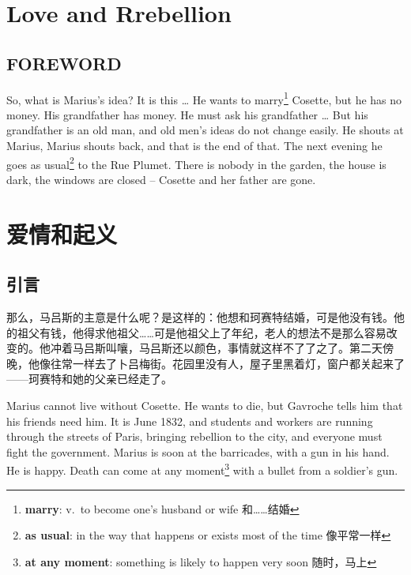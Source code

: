 \documentclass[fontset=ubuntu, zihao=5]{ctexart}
\begin{document}
\begin{paracol}{2}

\section{Love and Rrebellion}

\subsection*{FOREWORD}

So, what is Marius's idea? It is this \ldots{} He wants to
marry\footnote{\textbf{marry}: v. to become one's husband or wife 和……结婚}
Cosette, but he has no money. His grandfather has money. He must ask his
grandfather \ldots{} But his grandfather is an old man, and old men's ideas
do not change easily. He shouts at Marius, Marius shouts back, and that is
the end of that. The next evening he goes as usual\footnote{\textbf{as
    usual}: in the way that happens or exists most of the time 像平常一样}
to the Rue Plumet. There is nobody in the garden, the house is dark, the
windows are closed – Cosette and her father are gone.

\switchcolumn

\section*{爱情和起义}

\subsection*{引言}

那么，马吕斯的主意是什么呢？是这样的：他想和珂赛特结婚，可是他没有钱。他的祖父有钱，他得求他祖父……可是他祖父上了年纪，老人的想法不是那么容易改变的。他冲着马吕斯叫嚷，马吕斯还以颜色，事情就这样不了了之了。第二天傍晚，他像往常一样去了卜吕梅街。花园里没有人，屋子里黑着灯，窗户都关起来了——珂赛特和她的父亲已经走了。

\switchcolumn*

Marius cannot live without Cosette. He wants to die, but Gavroche tells him
that his friends need him. It is June 1832, and students and workers are
running through the streets of Paris, bringing rebellion to the city, and
everyone must fight the government. Marius is soon at the barricades, with a
gun in his hand. He is happy. Death can come at any
moment\footnote{\textbf{at any moment}: something is likely to happen very
  soon 随时，马上} with a bullet from a soldier's gun.



\end{paracol}
\end{document}
